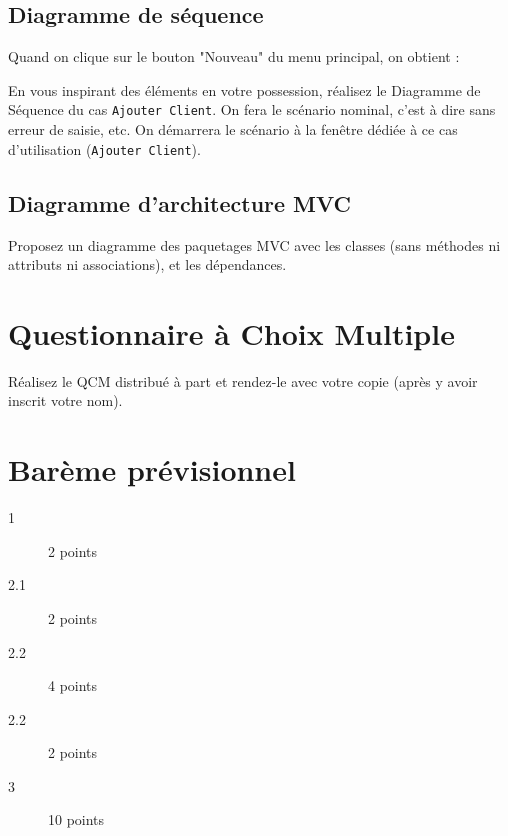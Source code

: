\documentclass[12pt]{article}
\def\ds{\textsf{Diagramme de S\'equence}}
\begin{document}
\subsection{Diagramme de séquence}

Quand on clique sur le bouton "Nouveau" du menu principal, on obtient :


En vous inspirant des éléments en votre possession, réalisez le \ds{} du cas \texttt{Ajouter Client}. On fera le scénario nominal, c'est à dire sans erreur de saisie, etc. On démarrera le scénario à la fenêtre dédiée à ce cas d'utilisation (\texttt{Ajouter Client}). 

\subsection{Diagramme d'architecture MVC}

Proposez un diagramme des paquetages MVC avec les classes (sans méthodes ni attributs
ni associations),  et les dépendances.

\section{Questionnaire à Choix Multiple}

Réalisez le QCM distribué à part et rendez-le avec votre copie (après y avoir inscrit votre nom).

\newpage
\section*{Bar\`eme prévisionnel}

\begin{description}
\item[1] 2 points 
\item[2.1] 2 points 
\item[2.2] 4 points 
\item[2.2] 2 points 
\item[3] 10 points 
\end{description}
\end{document}
